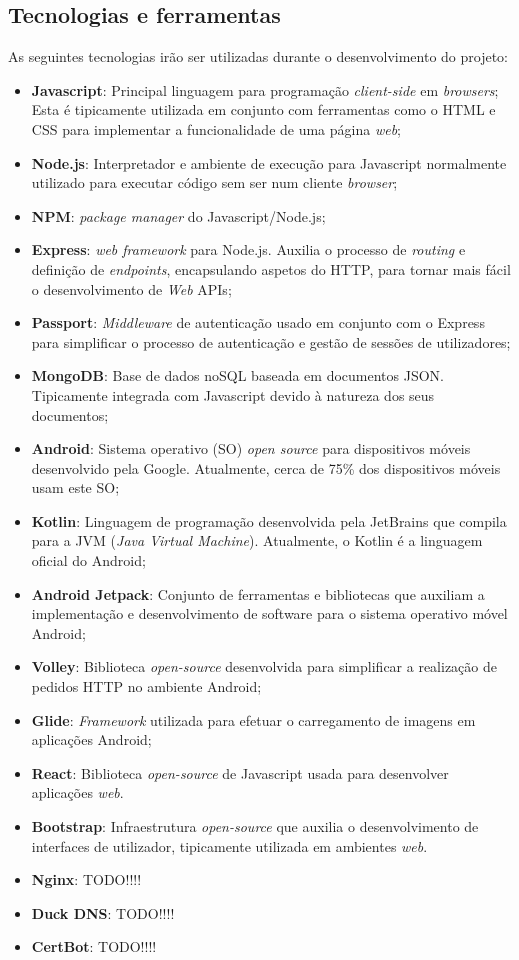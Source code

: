 \subsection{Tecnologias e ferramentas}
As seguintes tecnologias irão ser utilizadas durante o desenvolvimento do projeto:
\begin{itemize}
	\item \textbf{Javascript}: Principal linguagem para programação \textit{client-side} em \textit{browsers}; Esta é tipicamente utilizada em conjunto com ferramentas como o HTML e CSS para implementar a funcionalidade de uma página \textit{web};
	\item \textbf{Node.js}: Interpretador e ambiente de execução para Javascript normalmente utilizado para executar código sem ser num cliente \textit{browser};
	\item \textbf{NPM}: \textit{package manager} do Javascript/Node.js;
	\item \textbf{Express}: \textit{web framework} para Node.js. Auxilia o processo de \textit{routing} e definição de \textit{endpoints}, encapsulando aspetos do HTTP, para tornar mais fácil o desenvolvimento de \textit{Web} APIs;
	\item \textbf{Passport}: \textit{Middleware} de autenticação usado em conjunto com o Express para simplificar o processo de autenticação e gestão de sessões de utilizadores;
	\item \textbf{MongoDB}: Base de dados noSQL baseada em documentos JSON. Tipicamente integrada com Javascript devido à natureza dos seus documentos;
	\item \textbf{Android}: Sistema operativo (SO) \textit{open source} para dispositivos móveis desenvolvido pela Google. Atualmente, cerca de 75\% dos dispositivos móveis usam este SO;
	\item \textbf{Kotlin}: Linguagem de programação desenvolvida pela JetBrains que compila para a JVM (\textit{Java Virtual Machine}). Atualmente, o Kotlin é a linguagem oficial do Android;
	\item \textbf{Android Jetpack}: Conjunto de ferramentas e bibliotecas que auxiliam a implementação e desenvolvimento de software para o sistema operativo móvel Android;
	\item \textbf{Volley}: Biblioteca \textit{open-source} desenvolvida para simplificar a realização de pedidos HTTP no ambiente Android;
	\item \textbf{Glide}: \textit{Framework} utilizada para efetuar o carregamento de imagens em aplicações Android;
	\item \textbf{React}: Biblioteca \textit{open-source} de Javascript usada para desenvolver aplicações \textit{web}.
	\item \textbf{Bootstrap}: Infraestrutura \textit{open-source} que auxilia o desenvolvimento de interfaces de utilizador, tipicamente utilizada em ambientes \textit{web}.
	\item \textbf{Nginx}: TODO!!!!
	\item \textbf{Duck DNS}: TODO!!!!
	\item \textbf{CertBot}: TODO!!!!
\end{itemize}